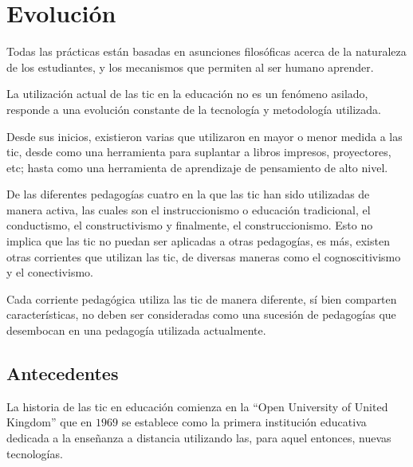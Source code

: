 \section{Evolución}
\label{sec:tics_educacion}

Todas las prácticas  están basadas en asunciones
filosóficas acerca de la naturaleza de los estudiantes, y los mecanismos que
permiten al ser humano aprender\cite{johnson2005instructionism}.

La utilización actual de las \Gls{tic} en la educación no es un fenómeno
asilado, responde a una evolución constante de la tecnología y metodología
utilizada.

Desde sus inicios, existieron varias  que
utilizaron en mayor o menor medida a las \Gls{tic}, desde  como una herramienta para suplantar a libros
impresos, proyectores, etc\cite{nanjappa2003constructing}; hasta como una
herramienta de aprendizaje de pensamiento de alto
nivel\cite{egenfeldt2007third,white:ict,nanjappa2003constructing}.

De las diferentes pedagogías  cuatro en la que las
\Gls{tic} han sido utilizadas de manera activa, las cuales son el
instruccionismo o educación tradicional, el conductismo, el constructivismo y
finalmente, el construccionismo. Esto no implica que las \Gls{tic} no puedan
ser aplicadas a otras pedagogías, es más, existen otras corrientes que utilizan
las \Gls{tic}, de diversas maneras como el
cognoscitivismo\cite{egenfeldt2007third} y el conectivismo\cite{white:ict}. 

Cada corriente pedagógica utiliza las \Gls{tic} de manera diferente, sí bien
comparten características, no deben ser consideradas como una sucesión de
pedagogías que desembocan en una pedagogía utilizada actualmente.

\subsection{Antecedentes}

La historia de las \Gls{tic} en educación comienza en la \enquote{Open
    University of United Kingdom} que en $1969$ se establece como la primera
institución educativa dedicada a la enseñanza a distancia utilizando las, para
aquel entonces, nuevas tecnologías\cite{tinio:ict}.

